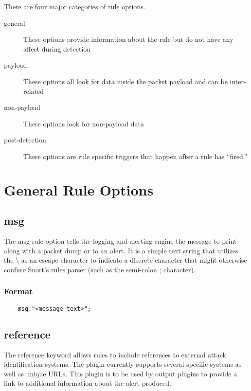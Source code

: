 \documentclass[english]{report}
\begin{document}
There are four major categories of rule options.  

\begin{description}

\item [general] These options provide information about the rule but do not
have any affect during detection 

\item [payload] These options all look for data inside the packet payload and
can be inter-related

\item [non-payload] These options look for non-payload data

\item [post-detection] These options are rule specific triggers that happen
after a rule has ``fired.''

\end{description}

\section{General Rule Options}

\subsection{msg}

The msg rule option tells the logging and alerting engine the message to print
along with a packet dump or to an alert. It is a simple text string that
utilizes the \textbackslash{} as an escape character to indicate a discrete
character that might otherwise confuse Snort's rules parser (such as the
semi-colon ; character).

\subsubsection{Format}

\begin{verbatim}
    msg:"<message text>";
\end{verbatim}

\subsection{reference}

The reference keyword allows rules to include references to external attack
identification systems. The plugin currently supports several specific systems
as well as unique URLs. This plugin is to be used by output plugins to provide
a link to additional information about the alert produced.
\end{document}
